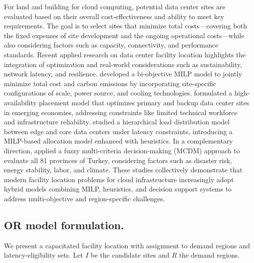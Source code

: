 \documentclass[pdflatex,sn-mathphys-num]{sn-jnl}
\theoremstyle{thmstyleone}
\theoremstyle{thmstyletwo}
\theoremstyle{thmstylethree}
\begin{document}

For land and building for cloud computing, potential data center sites are evaluated based on their overall cost-effectiveness and ability to meet key requirements. The goal is to select sites that minimize total costs---covering both the fixed expenses of site development and the ongoing operational costs---while also considering factors such as capacity, connectivity, and performance standards. %
Recent applied research on data center facility location highlights the integration of optimization and real-world considerations such as sustainability, network latency, and resilience. \cite{Wang2023} developed a bi-objective MILP model to jointly minimize total cost and carbon emissions by incorporating site-specific configurations of scale, power source, and cooling technologies. \cite{Liu2023} formulated a high-availability placement model that optimizes primary and backup data center sites in emerging economies, addressing constraints like limited technical workforce and infrastructure reliability. \cite{Vieira2022} studied a hierarchical load distribution model between edge and core data centers under latency constraints, introducing a MILP-based allocation model enhanced with heuristics. In a complementary direction,\cite{Yuna2020} applied a fuzzy multi-criteria decision-making (MCDM) approach to evaluate all 81 provinces of Turkey, considering factors such as disaster risk, energy stability, labor, and climate. These studies collectively demonstrate that modern facility location problems for cloud infrastructure increasingly adopt hybrid models combining MILP, heuristics, and decision support systems to address multi-objective and region-specific challenges.

\subsection{OR model formulation.} 

We present a capacitated facility location with assignment to demand regions and latency-eligibility sets. Let $I$ be the candidate sites and $R$ the demand regions.
\end{document}
